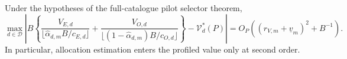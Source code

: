 Under the hypotheses of the full-catalogue pilot selector theorem,
\[
 \max_{d\in\mathcal D}\left|B\left\{
 \frac{V_{E,d}}{\lfloor\widehat\alpha_{d,m}B/c_{E,d}\rfloor}
 +\frac{V_{O,d}}{\lfloor(1-\widehat\alpha_{d,m})B/c_{O,d}\rfloor}
 \right\}-\mathcal V_d^*(P)\right|
 =O_P\!\left((r_{V,m}+\underline v_m)^2+B^{-1}\right).
\]
In particular, allocation estimation enters the profiled value only at second order.